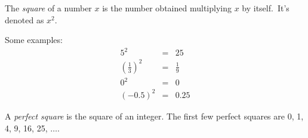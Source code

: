 \documentclass{article}
\begin{document}
The \emph{square} of a number $x$ is the number obtained multiplying $x$ by itself.\, It's denoted as $x^2$.

Some examples:
\begin{eqnarray*}
5^2&=&25\\
\left(\frac{1}{3}\right)^2&=&\frac{1}{9}\\
0^2&=&0\\
(-0.5)^2 &=& 0.25
\end{eqnarray*}

A \emph{perfect square} is the square of an integer.  The first few perfect squares are 0, 1, 4, 9, 16, 25, $\ldots$.
\end{document}
